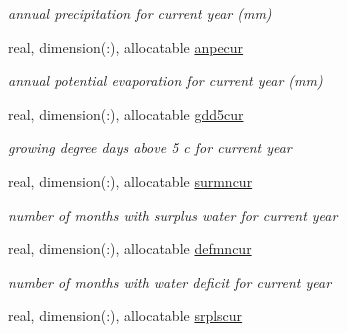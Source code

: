 \begin{DoxyCompactItemize}
\begin{DoxyCompactList}\small\item\em annual precipitation for current year (mm) \end{DoxyCompactList}\item 
\hypertarget{structctem__statevars_1_1veg__gat_a7164664eeb24d6ca8ca4e90ae28d6937}{}real, dimension(\+:), allocatable \hyperlink{structctem__statevars_1_1veg__gat_a7164664eeb24d6ca8ca4e90ae28d6937}{anpecur}\label{structctem__statevars_1_1veg__gat_a7164664eeb24d6ca8ca4e90ae28d6937}

\begin{DoxyCompactList}\small\item\em annual potential evaporation for current year (mm) \end{DoxyCompactList}\item 
\hypertarget{structctem__statevars_1_1veg__gat_a1c7556abbb4db1f29bbceda762c65cdb}{}real, dimension(\+:), allocatable \hyperlink{structctem__statevars_1_1veg__gat_a1c7556abbb4db1f29bbceda762c65cdb}{gdd5cur}\label{structctem__statevars_1_1veg__gat_a1c7556abbb4db1f29bbceda762c65cdb}

\begin{DoxyCompactList}\small\item\em growing degree days above 5 c for current year \end{DoxyCompactList}\item 
\hypertarget{structctem__statevars_1_1veg__gat_a1807426243ac62f71bc83d83daaab012}{}real, dimension(\+:), allocatable \hyperlink{structctem__statevars_1_1veg__gat_a1807426243ac62f71bc83d83daaab012}{surmncur}\label{structctem__statevars_1_1veg__gat_a1807426243ac62f71bc83d83daaab012}

\begin{DoxyCompactList}\small\item\em number of months with surplus water for current year \end{DoxyCompactList}\item 
\hypertarget{structctem__statevars_1_1veg__gat_a26aadfe13cbcaf938f07d4058095c0f9}{}real, dimension(\+:), allocatable \hyperlink{structctem__statevars_1_1veg__gat_a26aadfe13cbcaf938f07d4058095c0f9}{defmncur}\label{structctem__statevars_1_1veg__gat_a26aadfe13cbcaf938f07d4058095c0f9}

\begin{DoxyCompactList}\small\item\em number of months with water deficit for current year \end{DoxyCompactList}\item 
\hypertarget{structctem__statevars_1_1veg__gat_aa073015b721f01f8071ea8bae13ea295}{}real, dimension(\+:), allocatable \hyperlink{structctem__statevars_1_1veg__gat_aa073015b721f01f8071ea8bae13ea295}{srplscur}\label{structctem__statevars_1_1veg__gat_aa073015b721f01f8071ea8bae13ea295}


\end{DoxyCompactItemize}
